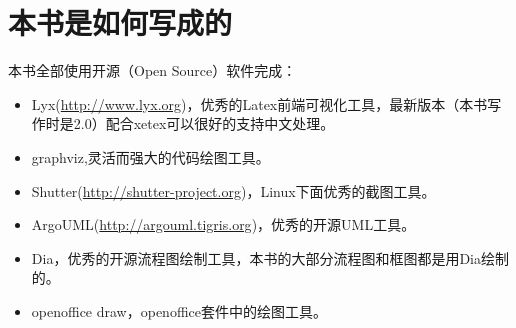 \section*{本书是如何写成的}
本书全部使用开源（Open Source）软件完成：
\begin{itemize}
    \item Lyx(\url{http://www.lyx.org})，优秀的Latex前端可视化工具，最新版本（本书写作时是2.0）配合xetex可以很好的支持中文处理。
    \item graphviz,灵活而强大的代码绘图工具。
    \item Shutter(\url{http://shutter-project.org})，Linux下面优秀的截图工具。
    \item ArgoUML(\url{http://argouml.tigris.org})，优秀的开源UML工具。
    \item Dia，优秀的开源流程图绘制工具，本书的大部分流程图和框图都是用Dia绘制的。
    \item openoffice draw，openoffice套件中的绘图工具。
\end{itemize}
\mainmatter
